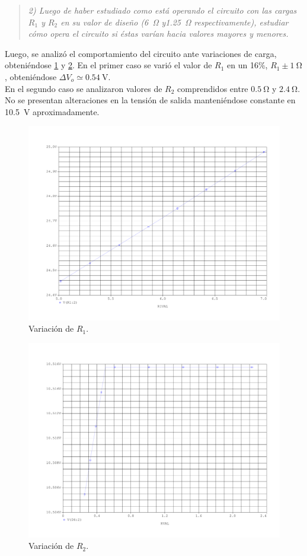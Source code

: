 \begin{quote} \textit{2) Luego de haber estudiado como está operando el circuito con las cargas $R_1$ y $R_2$ en su valor de diseño (\SI{6}{\ohm} y\SI{1.25}{\ohm} respectivamente), estudiar cómo opera el circuito si éstas varían hacia valores mayores y menores.}
\end{quote}

	Luego, se analizó el comportamiento del circuito ante variaciones de carga, obteniéndose \ref{fig:var_R1} y \ref{fig:var_R2}. En el primer caso se varió el valor de $R_1$ en un 16\%, $R_1 \pm \SI{1}{\ohm}$, obteniéndose $\Delta V_o \simeq \SI{0.54}{\volt}$.\\
	\indent En el segundo caso se analizaron valores de $R_2$ comprendidos entre $\SI{0.5}{\ohm}$ y $\SI{2.4}{\ohm}$. No se presentan alteraciones en la tensión de salida manteniéndose constante en \SI{10.5}{\volt} aproximadamente.

\begin{figure}[H]
	\centering
	\includegraphics[scale=0.3]{Figuras/2_var_R1.pdf}
	\caption{Variación de $R_1$.}
	\label{fig:var_R1}
\end{figure}

\begin{figure}[H]
	\centering
	\includegraphics[scale=0.3]{Figuras/2_var_R2.pdf}
	\caption{Variación de $R_2$.}
	\label{fig:var_R2}
\end{figure}



